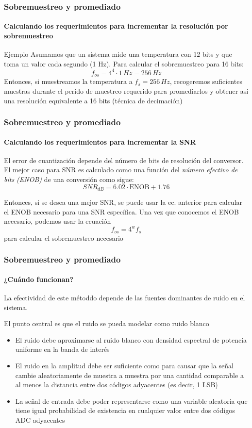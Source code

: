 \documentclass{beamer}
\begin{document}
\begin{frame}
\frametitle{Sobremuestreo y promediado}
\framesubtitle{Calculando los requerimientos para incrementar la resolución por
sobremuestreo}
\begin{block}{Ejemplo}
Asumamos que un sistema mide una temperatura con 12 bits y que toma un valor
cada segundo (1 Hz). Para calcular el sobremuestreo para 16 bits:
$$f_{os} = 4^4\cdot1\,Hz = 256\,Hz$$
Entonces, si muestreamos la temperatura a $f_s = 256\,Hz$, recogeremos
suficientes muestras durante el perído de muestreo requerido para promediarlos y
obtener así una resolución equivalente a 16 bits (\alert{técnica de decimación}) 
\end{block}
\end{frame}

\begin{frame}
\frametitle{Sobremuestreo y promediado}
\framesubtitle{Calculando los requerimientos para incrementar la SNR}
El error de cuantización depende del número de bits de resolución del
conversor. El mejor caso para SNR es calculado como una función del
\textit{número efectivo de bits (ENOB)} de una conversión como sigue:
$$SNR_{dB} = 6.02\cdot\text{ENOB} + 1.76$$

Entonces, si se desea una mejor SNR, se puede usar la ec. anterior para calcular
el ENOB necesario para una SNR específica. Una vez que conocemos el ENOB
necesario, podemos usar la ecuación  $$f_{os} = 4^w f_s$$ para calcular el
sobremuestreo necesario 
\end{frame}

\begin{frame}
\frametitle{Sobremuestreo y promediado}
\framesubtitle{¿Cuándo funcionan?}
La efectividad de este métoddo depende de las fuentes dominantes de ruido en el
sistema.
{
\begin{block}{}
El punto central es que el ruido se pueda modelar como ruido blanco
\end{block}}
\begin{itemize}
\item El ruido debe aproximarse al ruido blanco con densidad espectral de
potencia uniforme en la banda de interés 
\item El ruido en la amplitud debe ser suficiente como para causar que la señal
cambie aleatoriamente de muestra a muestra por una cantidad comparable a al
menos la distancia entre dos códigos adyacentes (es decir, 1 LSB) 
\item La señal de entrada debe poder representarse como una variable aleatoria
que tiene igual probabilidad de existencia en cualquier valor entre dos códigos
ADC adyacentes 
\end{itemize}
\end{frame}
\end{document}
